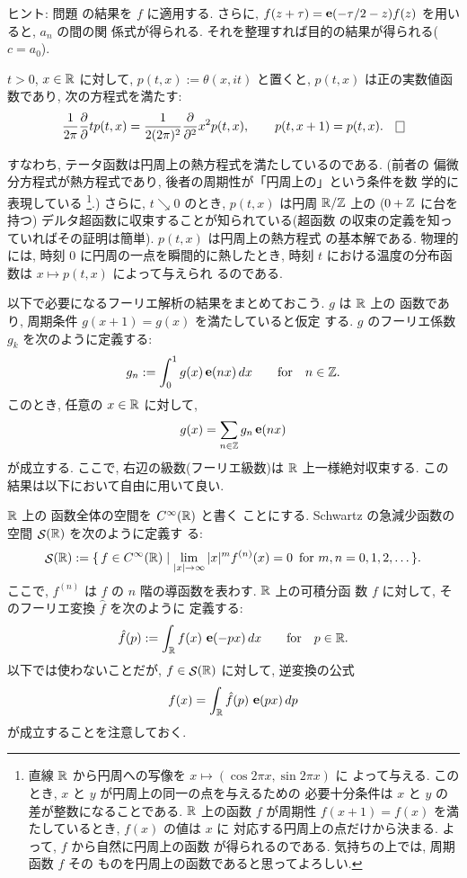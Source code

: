 \documentclass[12pt,twoside]{jarticle}
\begin{document}
\noindent ヒント: 問題  の結果を $f$ に適用する.
さらに, $f(z+\tau) = \mathop{\mathbf{e}}\nolimits(-\tau/2 - z) f(z)$ を用いると, $a_n$ の間の関
係式が得られる. それを整理すれば目的の結果が得られる($c=a_0$).

\begin{question}[熱方程式]
  $t > 0$, $x\in{\mathbb R}$ に対して, $p(t,x) := \theta(x,it)$ と置くと,
  $p(t,x)$ は正の実数値函数であり, 次の方程式を満たす:
  \[
    \frac{1}{2\pi}\pd{}{t} p(t,x) = \frac{1}{2(2\pi)^2}\pd{^2}{x^2} p(t,x),
    \qquad
    p(t,x+1) = p(t,x).
  \qed
  \]%
\end{question}

\noindent %
すなわち, テータ函数は円周上の熱方程式を満たしているのである. (前者の
偏微分方程式が熱方程式であり, 後者の周期性が「円周上の」という条件を数
学的に表現している
%
\footnote{%
  直線 ${\mathbb R}$ から円周への写像を $x\mapsto(\cos 2\pi x, \sin 2\pi x)$ に
  よって与える. このとき, $x$ と $y$ が円周上の同一の点を与えるための
  必要十分条件は $x$ と $y$ の差が整数になることである. ${\mathbb R}$ 上の函数 
  $f$ が周期性 $f(x+1)=f(x)$ を満たしているとき, $f(x)$ の値は $x$ に
  対応する円周上の点だけから決まる. よって, $f$ から自然に円周上の函数
  が得られるのである. 気持ちの上では, 周期函数 $f$ その
  ものを円周上の函数であると思ってよろしい. }.) 
%
さらに, $t\searrow 0$ のとき, $p(t,x)$ は円周 ${\mathbb R}/{\mathbb Z}$ 上の %
($0 + {\mathbb Z}$ に台を持つ) デルタ超函数に収束することが知られている(超函数
の収束の定義を知っていればその証明は簡単). $p(t,x)$ は円周上の熱方程式
の基本解である. 物理的には, 時刻 $0$ に円周の一点を瞬間的に熱したとき, 
時刻 $t$ における温度の分布函数は $x \mapsto p(t,x)$ によって与えられ
るのである. 

以下で必要になるフーリエ解析の結果をまとめておこう. $g$ は ${\mathbb R}$ 上の
\Class{\infty}函数であり, 周期条件 $g(x+1)=g(x)$ を満たしていると仮定
する. $g$ のフーリエ係数 $g_k$ を次のように定義する:
\[
  g_n := \int_0^1 g(x) \mathop{\mathbf{e}}\nolimits(nx) \,dx
  \qquad\text{for}\quad n \in {\mathbb Z}.
\]
このとき, 任意の $x\in{\mathbb R}$ に対して,
\[
  g(x) = \sum_{n\in{\mathbb Z}} g_n \mathop{\mathbf{e}}\nolimits(nx)
\]%
が成立する. ここで, 右辺の級数(フーリエ級数)は ${\mathbb R}$ 上一様絶対収束する.
この結果は以下において自由に用いて良い.

${\mathbb R}$ 上の \Class{\infty} 函数全体の空間を $\text{$C^{\infty}$}({\mathbb R})$ と書く
ことにする. Schwartz の急減少函数の空間 $\mathop{\mathcal{S}}\nolimits({\mathbb R})$ を次のように定義す
る:
\[
  \mathop{\mathcal{S}}\nolimits({\mathbb R})
  :=
  \{\, f \in \text{$C^{\infty}$}({\mathbb R}) \mid
       \lim_{|x|\to\infty} |x|^m f^{(n)}(x) = 0
       \enspace \text{for}\  m,n = 0,1,2,\dots \,\}.
\]%
ここで, $f^{(n)}$ は $f$ の $n$ 階の導函数を表わす. ${\mathbb R}$ 上の可積分函
数 $f$ に対して, そのフーリエ変換 $\hat f$ を次のように
定義する:
\[
  \hat f(p) := \int_{\mathbb R} f(x)\,\mathop{\mathbf{e}}\nolimits(-px)\,dx
  \qquad\text{for}\quad p \in {\mathbb R}.
\]%
以下では使わないことだが, $f \in \mathop{\mathcal{S}}\nolimits({\mathbb R})$ に対して, 逆変換の公式
\[
  f(x) = \int_{\mathbb R} \hat f(p)\,\mathop{\mathbf{e}}\nolimits(px)\,dp
\]
が成立することを注意しておく.
\end{document}
